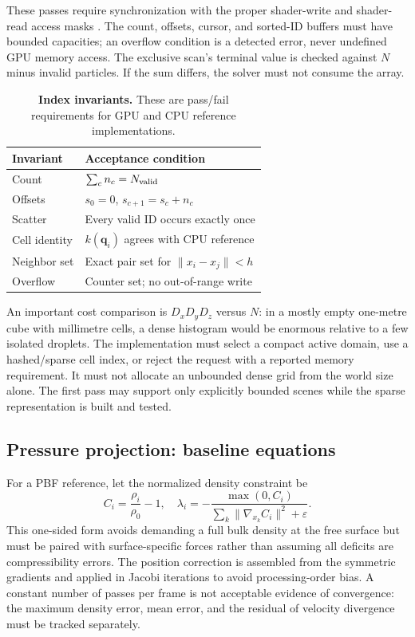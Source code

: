 \documentclass[10pt,a4paper]{article}
\begin{document}
These passes require synchronization with the proper shader-write and shader-read access masks \citep{vulkanSync}. The count, offsets, cursor, and sorted-ID buffers must have bounded capacities; an overflow condition is a detected error, never undefined GPU memory access. The exclusive scan's terminal value is checked against $N$ minus invalid particles. If the sum differs, the solver must not consume the array.

\begin{table}[t]
\centering\footnotesize
\caption{\textbf{Index invariants.} These are pass/fail requirements for GPU and CPU reference implementations.}
\begin{tabularx}{\columnwidth}{@{}p{}X@{}}
\toprule
Invariant & Acceptance condition\\
\midrule
Count & $\sum_c n_c=N_{\rm valid}$\\
Offsets & $s_0=0$, $s_{c+1}=s_c+n_c$\\
Scatter & Every valid ID occurs exactly once\\
Cell identity & $k(\mathbf q_i)$ agrees with CPU reference\\
Neighbor set & Exact pair set for $\|x_i-x_j\|<h$\\
Overflow & Counter set; no out-of-range write\\
\bottomrule
\end{tabularx}
\label{tab:index}
\end{table}

An important cost comparison is $D_xD_yD_z$ versus $N$: in a mostly empty one-metre cube with millimetre cells, a dense histogram would be enormous relative to a few isolated droplets. The implementation must select a compact active domain, use a hashed/sparse cell index, or reject the request with a reported memory requirement. It must not allocate an unbounded dense grid from the world size alone. The first pass may support only explicitly bounded scenes while the sparse representation is built and tested.

\subsection{Pressure projection: baseline equations}
For a PBF reference, let the normalized density constraint be
\begin{equation}
C_i=\frac{\rho_i}{\rho_0}-1,\quad
\lambda_i=-\frac{\max(0,C_i)}{\sum_k\|\nabla_{x_k}C_i\|^2+\varepsilon}.
\label{eq:pbf}
\end{equation}
This one-sided form avoids demanding a full bulk density at the free surface but must be paired with surface-specific forces rather than assuming all deficits are compressibility errors. The position correction is assembled from the symmetric gradients and applied in Jacobi iterations to avoid processing-order bias. A constant number of passes per frame is not acceptable evidence of convergence: the maximum density error, mean error, and the residual of velocity divergence must be tracked separately.
\end{document}
